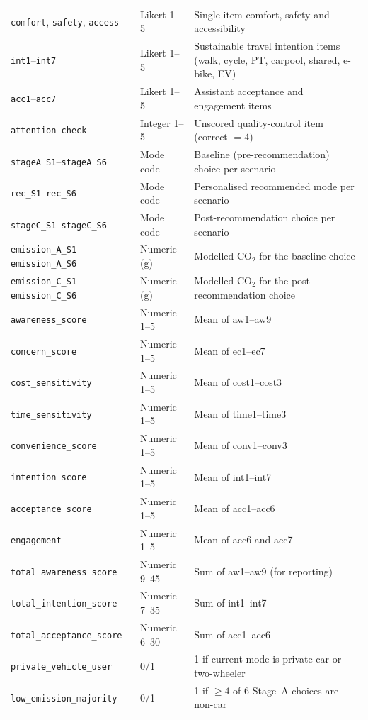\documentclass[11pt,a4paper]{article}
\newcommand{\code}[1]{\texttt{#1}}
\begin{document}
\begin{longtable}{@{}p{3.5cm}p{1.9cm}p{8.2cm}@{}}
\code{comfort}, \code{safety}, \code{access} & Likert 1--5 & Single-item comfort, safety and accessibility\\
\code{int1}--\code{int7} & Likert 1--5 & Sustainable travel intention items (walk, cycle, PT, carpool, shared, e-bike, EV)\\
\code{acc1}--\code{acc7} & Likert 1--5 & Assistant acceptance and engagement items\\
\code{attention\_check} & Integer 1--5 & Unscored quality-control item (correct $=4$)\\
\code{stageA\_S1}--\code{stageA\_S6} & Mode code & Baseline (pre-recommendation) choice per scenario\\
\code{rec\_S1}--\code{rec\_S6} & Mode code & Personalised recommended mode per scenario\\
\code{stageC\_S1}--\code{stageC\_S6} & Mode code & Post-recommendation choice per scenario\\
\code{emission\_A\_S1}--\code{emission\_A\_S6} & Numeric (g) & Modelled CO$_2$ for the baseline choice\\
\code{emission\_C\_S1}--\code{emission\_C\_S6} & Numeric (g) & Modelled CO$_2$ for the post-recommendation choice\\
\code{awareness\_score} & Numeric 1--5 & Mean of aw1--aw9\\
\code{concern\_score} & Numeric 1--5 & Mean of ec1--ec7\\
\code{cost\_sensitivity} & Numeric 1--5 & Mean of cost1--cost3\\
\code{time\_sensitivity} & Numeric 1--5 & Mean of time1--time3\\
\code{convenience\_score} & Numeric 1--5 & Mean of conv1--conv3\\
\code{intention\_score} & Numeric 1--5 & Mean of int1--int7\\
\code{acceptance\_score} & Numeric 1--5 & Mean of acc1--acc6\\
\code{engagement} & Numeric 1--5 & Mean of acc6 and acc7\\
\code{total\_awareness\_score} & Numeric 9--45 & Sum of aw1--aw9 (for reporting)\\
\code{total\_intention\_score} & Numeric 7--35 & Sum of int1--int7\\
\code{total\_acceptance\_score} & Numeric 6--30 & Sum of acc1--acc6\\
\code{private\_vehicle\_user} & 0/1 & 1 if current mode is private car or two-wheeler\\
\code{low\_emission\_majority} & 0/1 & 1 if $\geq 4$ of 6 Stage~A choices are non-car\\

\end{longtable}
\end{document}
